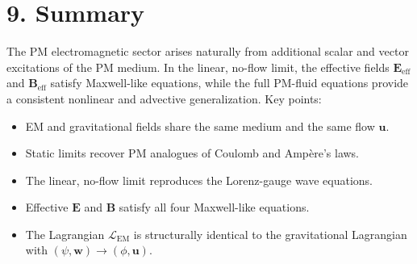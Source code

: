 \documentclass{article}
\begin{document}
\section*{9. Summary}

The PM electromagnetic sector arises naturally from additional scalar and vector
excitations of the PM medium.  In the linear, no-flow limit, the effective
fields $\mathbf E_{\mathrm{eff}}$ and $\mathbf B_{\mathrm{eff}}$ satisfy
Maxwell-like equations, while the full PM-fluid equations provide a consistent
nonlinear and advective generalization.  Key points:

\begin{itemize}
    \item EM and gravitational fields share the same medium and the same flow $\mathbf u$.
    \item Static limits recover PM analogues of Coulomb and Amp\`ere's laws.
    \item The linear, no-flow limit reproduces the Lorenz-gauge wave equations.
    \item Effective $\mathbf E$ and $\mathbf B$ satisfy all four Maxwell-like equations.
    \item The Lagrangian $\mathcal{L}_{\mathrm{EM}}$ is structurally identical to the
          gravitational Lagrangian with $(\psi,\mathbf w) \to (\phi,\mathbf u)$.
\end{itemize}
\end{document}
